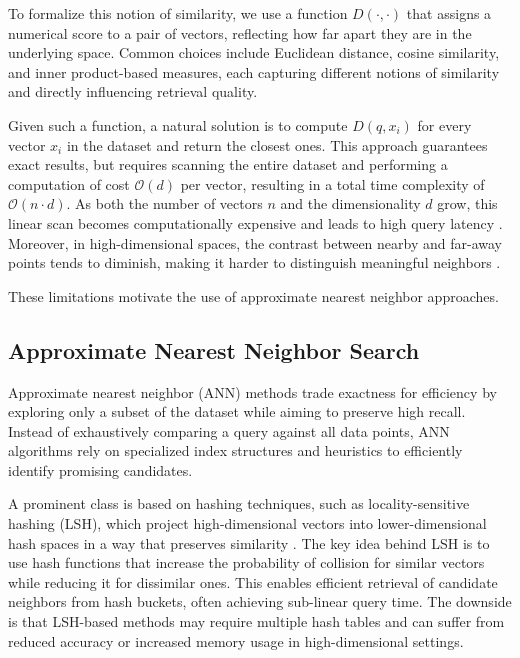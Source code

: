 To formalize this notion of similarity, we use a function $D(\cdot, \cdot)$ that assigns a numerical score to a pair of vectors, reflecting how far apart they are in the underlying space. Common choices include Euclidean distance, cosine similarity, and inner product-based measures, each capturing different notions of similarity and directly influencing retrieval quality.

Given such a function, a natural solution is to compute $D(q, x_i)$ for every vector $x_i$ in the dataset and return the closest ones. This approach guarantees exact results, but requires scanning the entire dataset and performing a computation of cost $\mathcal{O}(d)$ per vector, resulting in a total time complexity of $\mathcal{O}(n \cdot d)$. As both the number of vectors $n$ and the dimensionality $d$ grow, this linear scan becomes computationally expensive and leads to high query latency \cite{arya1998optimal}. Moreover, in high-dimensional spaces, the contrast between nearby and far-away points tends to diminish, making it harder to distinguish meaningful neighbors \cite{indyk1998approximate}.

These limitations motivate the use of approximate nearest neighbor approaches.

\subsection{Approximate Nearest Neighbor Search}

Approximate nearest neighbor (ANN) methods trade exactness for efficiency by exploring only a subset of the dataset while aiming to preserve high recall. Instead of exhaustively comparing a query against all data points, ANN algorithms rely on specialized index structures and heuristics to efficiently identify promising candidates.

A prominent class is based on hashing techniques, such as locality-sensitive hashing (LSH), which project high-dimensional vectors into lower-dimensional hash spaces in a way that preserves similarity \cite{jafari2021surveylocalitysensitivehashing, gionis1999similarity}. The key idea behind LSH is to use hash functions that increase the probability of collision for similar vectors while reducing it for dissimilar ones. This enables efficient retrieval of candidate neighbors from hash buckets, often achieving sub-linear query time. The downside is that LSH-based methods may require multiple hash tables and can suffer from reduced accuracy or increased memory usage in high-dimensional settings.

